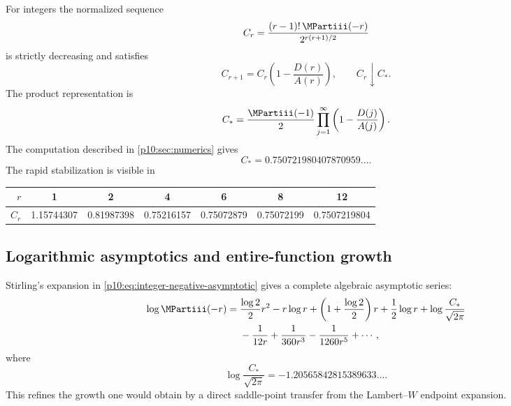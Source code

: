 \documentclass[11pt,oneside]{article}
\theoremstyle{definition}
\theoremstyle{remark}
\newcommand{\1}{\mathbf 1}
\begin{document}
For integers the normalized sequence
\begin{equation}\label{p10:eq:Cr-def}
 C_r=\frac{(r-1)!\,\MPartiii(-r)}{2^{r(r+1)/2}}
\end{equation}
is strictly decreasing and satisfies
\begin{equation}\label{p10:eq:Cr-rec}
 C_{r+1}=C_r\left(1-\frac{D(r)}{A(r)}\right),
 \qquad C_r\downarrow C_*.
\end{equation}
The product representation is
\begin{equation}\label{p10:eq:Cstar-product}
 C_*=\frac{\MPartiii(-1)}2
 \prod_{j=1}^{\infty}
 \left(1-\frac{D(j)}{A(j)}\right).
\end{equation}
The computation described in \cref{p10:sec:numerics} gives
\begin{equation}\label{p10:eq:Cstar-numeric}
 C_*=0.750721980407870959\ldots.
\end{equation}
The rapid stabilization is visible in
\begin{center}
\small
\begin{tabular}{@{}rcccccc@{}}
\toprule
\(r\)&1&2&4&6&8&12\\
\midrule
\(C_r\)&1.15744307&0.81987398&0.75216157&0.75072879&
0.75072199&0.7507219804\\
\bottomrule
\end{tabular}
\end{center}

\subsection{Logarithmic asymptotics and entire-function growth}

Stirling's expansion in \cref{p10:eq:integer-negative-asymptotic} gives a complete
algebraic asymptotic series:
\begin{align}
 \log\MPartiii(-r)
 ={}&\frac{\log2}{2}r^2-r\log r
 +\left(1+\frac{\log2}{2}\right)r
 +\frac12\log r
 +\log\frac{C_*}{\sqrt{2\pi}}
 \nonumber\\
 &-\frac1{12r}+\frac1{360r^3}-\frac1{1260r^5}+\cdots,
 \label{p10:eq:log-negative-asymptotic}
\end{align}
where
\begin{equation}\label{p10:eq:log-Cstar-numeric}
 \log\frac{C_*}{\sqrt{2\pi}}
 =-1.20565842815389633\ldots.
\end{equation}
This refines the growth one would obtain by a direct saddle-point transfer from the
Lambert--\(W\) endpoint expansion.
\end{document}
